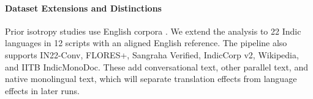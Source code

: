 \paragraph{Dataset Extensions and Distinctions}
Prior isotropy studies use English corpora \citep{ethayarajh-2019-contextual,rudman-etal-2022-isoscore}. We extend the analysis to 22 Indic languages in 12 scripts with an aligned English reference. The pipeline also supports IN22-Conv, FLORES+, Sangraha Verified, IndicCorp v2, Wikipedia, and IITB IndicMonoDoc. These add conversational text, other parallel text, and native monolingual text, which will separate translation effects from language effects in later runs.
